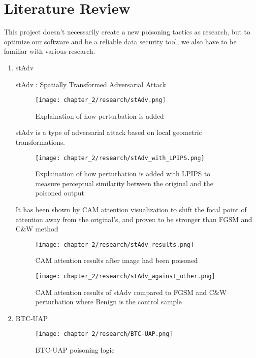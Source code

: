 \section{Literature Review}
\label{section:literature-review}
This project doesn't necessarily create a new poisoning tactics as research, but to optimize our software and be a reliable data security tool, we also have to be familiar with various research.
\begin{enumerate}
    \item stAdv
        
    \par stAdv : Spatially Transformed Adversarial Attack
    \begin{figure}[h]
        \centering
        \texttt{[image: chapter\_2/research/stAdv.png]}
        \caption{Explaination of how perturbation is added}
    
    \end{figure}

    stAdv is a type of adversarial attack based on local geometric transformations.
    \begin{figure}[h]
        \centering
        \texttt{[image: chapter\_2/research/stAdv\_with\_LPIPS.png]}
        \caption{Explaination of how perturbation is added with LPIPS to measure perceptual similarity between the original and the poisoned output}
    
    \end{figure}

    It has been shown by CAM attention visualization to shift the focal point of attention away from the original's, and proven to be stronger than FGSM and C\&W method
    \begin{figure}[h]
        \centering
        \texttt{[image: chapter\_2/research/stAdv\_results.png]}
        \caption{CAM attention results after image had been poisoned}
    
    \end{figure}
    \begin{figure}[h]
        \centering
        \texttt{[image: chapter\_2/research/stAdv\_against\_other.png]}
        \caption{CAM attention results of stAdv compared to FGSM and C\&W perturbation where Benign is the control sample}
    
    \end{figure}

    \clearpage

    \item BTC-UAP
    \begin{figure}[h]
        \centering
        \texttt{[image: chapter\_2/research/BTC-UAP.png]}
        \caption{BTC-UAP poisoning logic}
    

\end{figure}
\end{enumerate}
